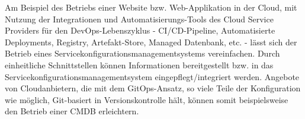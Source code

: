 Am Beispiel des Betriebs einer Website bzw. Web-Applikation in der Cloud,
mit Nutzung der Integrationen und Automatisierungs-Tools des
Cloud Service Providers für den DevOps-Lebenszyklus - 
CI/CD-Pipeline, Automatisierte Deployments, Registry, 
Artefakt-Store, Managed Datenbank, etc. - lässt sich der Betrieb eines
Servicekonfigurationsmanagementsystems vereinfachen. Durch einheitliche
Schnittstellen können Informationen bereitgestellt bzw. in das 
Servicekonfigurationsmanagementsystem eingepflegt/integriert werden.
Angebote von Cloudanbietern, die mit dem GitOps-Ansatz,
so viele Teile der Konfiguration wie möglich, Git-basiert in Versionskontrolle
hält, können somit beispielsweise den Betrieb einer CMDB erleichtern.

